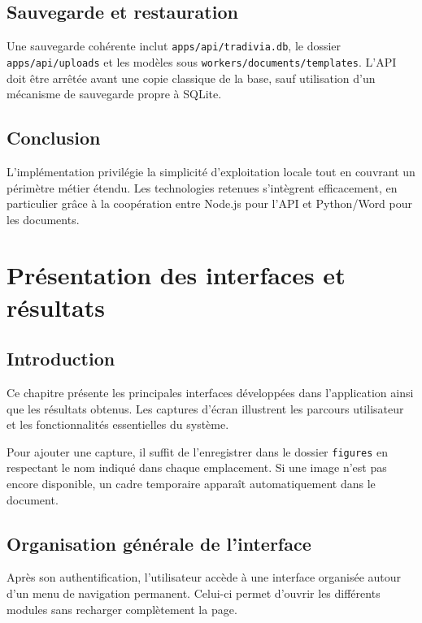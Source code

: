 \documentclass[12pt,a4paper,oneside]{report}
\newcommand{\code}[1]{\texttt{#1}}
\newif\ifshowmissingfigures
\begin{document}
\section{Sauvegarde et restauration}
Une sauvegarde cohérente inclut \code{apps/api/tradivia.db}, le dossier \code{apps/api/uploads} et les modèles sous \code{workers/documents/templates}. L'API doit être arrêtée avant une copie classique de la base, sauf utilisation d'un mécanisme de sauvegarde propre à SQLite.

\section*{Conclusion}
L'implémentation privilégie la simplicité d'exploitation locale tout en couvrant un périmètre métier étendu. Les technologies retenues s'intègrent efficacement, en particulier grâce à la coopération entre Node.js pour l'API et Python/Word pour les documents.

\chapter{Présentation des interfaces et résultats}
\label{chap:interfaces}
\showmissingfigurestrue

\section*{Introduction}

Ce chapitre présente les principales interfaces développées dans
l'application ainsi que les résultats obtenus. Les captures d'écran
illustrent les parcours utilisateur et les fonctionnalités essentielles
du système.

Pour ajouter une capture, il suffit de l'enregistrer dans le dossier
\code{figures} en respectant le nom indiqué dans chaque emplacement.
Si une image n'est pas encore disponible, un cadre temporaire apparaît
automatiquement dans le document.

\section{Organisation générale de l'interface}

Après son authentification, l'utilisateur accède à une interface organisée
autour d'un menu de navigation permanent. Celui-ci permet d'ouvrir les
différents modules sans recharger complètement la page.
\end{document}
